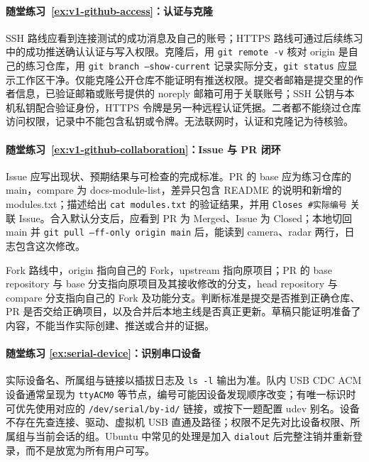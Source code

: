 \paragraph*{随堂练习~\ref{ex:v1-github-access}：认证与克隆}
\begin{solution}
SSH 路线应看到连接测试的成功消息及自己的账号；HTTPS 路线可通过后续练习中的成功推送确认认证与写入权限。克隆后，用 \texttt{git remote -v} 核对 origin 是自己的练习仓库，用 \texttt{git branch --show-current} 记录实际分支，\texttt{git status} 应显示工作区干净。仅能克隆公开仓库不能证明有推送权限。提交者邮箱是提交里的作者信息，已验证邮箱或账号提供的 noreply 邮箱可用于关联账号；SSH 公钥与本机私钥配合验证身份，HTTPS 令牌是另一种远程认证凭据。二者都不能绕过仓库访问权限，记录中不能包含私钥或令牌。无法联网时，认证和克隆记为待核验。
\end{solution}

\paragraph*{随堂练习~\ref{ex:v1-github-collaboration}：Issue 与 PR 闭环}
\begin{solution}
Issue 应写出现状、预期结果与可检查的完成标准。PR 的 base 应为练习仓库的 main，compare 为 docs-module-list，差异只包含 README 的说明和新增的 modules.txt；描述给出 \texttt{cat modules.txt} 的验证结果，并用 \texttt{Closes \#实际编号} 关联 Issue。合入默认分支后，应看到 PR 为 Merged、Issue 为 Closed；本地切回 main 并 \texttt{git pull --ff-only origin main} 后，能读到 camera、radar 两行，日志包含这次修改。

Fork 路线中，origin 指向自己的 Fork，upstream 指向原项目；PR 的 base repository 与 base 分支指向原项目及其接收修改的分支，head repository 与 compare 分支指向自己的 Fork 及功能分支。判断标准是提交是否推到正确仓库、PR 是否交给正确项目，以及合并后本地主线是否真正更新。草稿只能证明准备了内容，不能当作实际创建、推送或合并的证据。
\end{solution}

\paragraph*{随堂练习 \ref{ex:serial-device}：识别串口设备}
\begin{solution}
实际设备名、所属组与链接以插拔日志及 \texttt{ls -l} 输出为准。队内 USB CDC ACM 设备通常呈现为 \texttt{ttyACM0} 等节点，编号可能因设备发现顺序改变；有唯一标识时可优先使用对应的 \texttt{/dev/serial/by-id/} 链接，或按下一题配置 udev 别名。设备不存在先查连接、驱动、虚拟机 USB 直通及路径；权限不足先对比设备权限、所属组与当前会话的组。Ubuntu 中常见的处理是加入 \texttt{dialout} 后完整注销并重新登录，而不是放宽为所有用户可写。
\end{solution}

